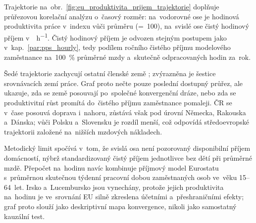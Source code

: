 Trajektorie na~obr.~\ref{fig:eu_produktivita_prijem_trajektorie} doplňuje průřezovou korelační analýzu o~časový rozměr: na~vodorovné ose je hodinová produktivita práce v~indexu vůči průměru  (=~100), na~svislé ose čistý hodinový příjem v~\si{\pps\per\hour}. Čistý hodinový příjem je odvozen stejným postupem jako v~kap.~\ref{par:pps_hourly}, tedy podílem ročního čistého příjmu modelového zaměstnance na~\SI{100}{\percent} průměrné mzdy a~skutečně odpracovaných hodin za~rok.

Šedé trajektorie zachycují ostatní členské země ; zvýrazněna je šestice srovnávacích zemí práce. Graf proto nečte pouze poslední dostupný průřez, ale ukazuje, zda se země posouvají po~společné konvergenční dráze, nebo zda se produktivitní růst promítá do~čistého příjmu zaměstnance pomaleji. \Ac{ČR} se v~čase posouvá doprava i~nahoru, zůstává však pod úrovní Německa, Rakouska a~Dánska; vůči Polsku a~Slovensku je rozdíl menší, což odpovídá středoevropské trajektorii založené na~nižších mzdových nákladech.

Metodický limit spočívá v~tom, že svislá osa není pozorovaný disponibilní příjem domácností, nýbrž standardizovaný čistý příjem jednotlivce bez dětí při průměrné mzdě. Přepočet na~hodinu navíc kombinuje příjmový model Eurostatu s~průměrnou skutečnou týdenní pracovní dobou zaměstnaných osob ve~věku 15--64~let. Irsko a~Lucembursko jsou vynechány, protože jejich produktivita na~hodinu je ve~srovnání EU silně zkreslena účetními a~přeshraničními efekty; graf proto slouží jako deskriptivní mapa konvergence, nikoli jako samostatný kauzální test.


